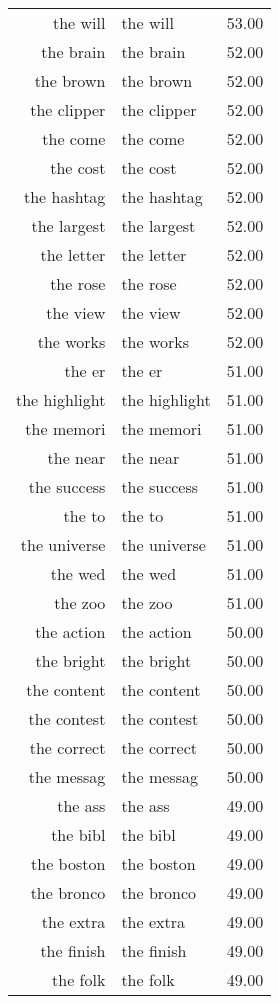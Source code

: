 \begin{table}[ht]
\begin{tabular}{rlr}
  the will & the will & 53.00 \\ 
  the brain & the brain & 52.00 \\ 
  the brown & the brown & 52.00 \\ 
  the clipper & the clipper & 52.00 \\ 
  the come & the come & 52.00 \\ 
  the cost & the cost & 52.00 \\ 
  the hashtag & the hashtag & 52.00 \\ 
  the largest & the largest & 52.00 \\ 
  the letter & the letter & 52.00 \\ 
  the rose & the rose & 52.00 \\ 
  the view & the view & 52.00 \\ 
  the works & the works & 52.00 \\ 
  the er & the er & 51.00 \\ 
  the highlight & the highlight & 51.00 \\ 
  the memori & the memori & 51.00 \\ 
  the near & the near & 51.00 \\ 
  the success & the success & 51.00 \\ 
  the to & the to & 51.00 \\ 
  the universe & the universe & 51.00 \\ 
  the wed & the wed & 51.00 \\ 
  the zoo & the zoo & 51.00 \\ 
  the action & the action & 50.00 \\ 
  the bright & the bright & 50.00 \\ 
  the content & the content & 50.00 \\ 
  the contest & the contest & 50.00 \\ 
  the correct & the correct & 50.00 \\ 
  the messag & the messag & 50.00 \\ 
  the ass & the ass & 49.00 \\ 
  the bibl & the bibl & 49.00 \\ 
  the boston & the boston & 49.00 \\ 
  the bronco & the bronco & 49.00 \\ 
  the extra & the extra & 49.00 \\ 
  the finish & the finish & 49.00 \\ 
  the folk & the folk & 49.00 \\ 

\end{tabular}
\end{table}

